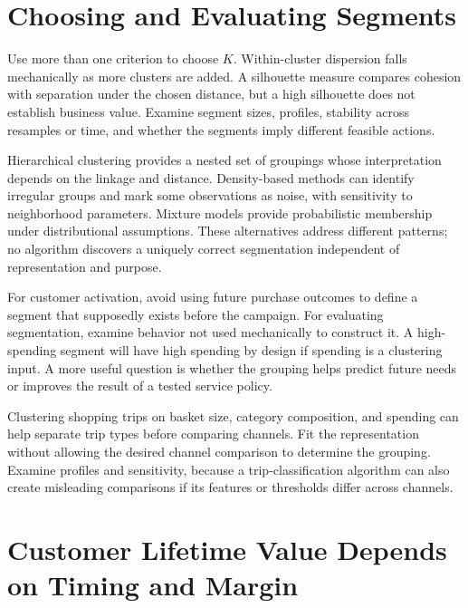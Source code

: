 \hypertarget{M04-choosing-and-evaluating-segments}{%
\section{Choosing and Evaluating
Segments}\label{M04-choosing-and-evaluating-segments}}

\noindent Use more than one criterion to choose \(K\). Within-cluster dispersion
falls mechanically as more clusters are added. A silhouette measure
compares cohesion with separation under the chosen distance, but a high
silhouette does not establish business value. Examine segment sizes,
profiles, stability across resamples or time, and whether the segments
imply different feasible actions.

Hierarchical clustering provides a nested set of groupings whose
interpretation depends on the linkage and distance. Density-based
methods can identify irregular groups and mark some observations as
noise, with sensitivity to neighborhood parameters. Mixture models
provide probabilistic membership under distributional assumptions. These
alternatives address different patterns; no algorithm discovers a
uniquely correct segmentation independent of representation and purpose.

For customer activation, avoid using future purchase outcomes to define
a segment that supposedly exists before the campaign. For evaluating
segmentation, examine behavior not used mechanically to construct it. A
high-spending segment will have high spending by design if spending is a
clustering input. A more useful question is whether the grouping helps
predict future needs or improves the result of a tested service policy.

Clustering shopping trips on basket size, category composition, and
spending can help separate trip types before comparing channels. Fit the
representation without allowing the desired channel comparison to
determine the grouping. Examine profiles and sensitivity, because a
trip-classification algorithm can also create misleading comparisons if
its features or thresholds differ across channels.

\hypertarget{M04-customer-lifetime-value-depends-on-timing-and-margin}{%
\section{Customer Lifetime Value Depends on Timing and
Margin}\label{M04-customer-lifetime-value-depends-on-timing-and-margin}}

